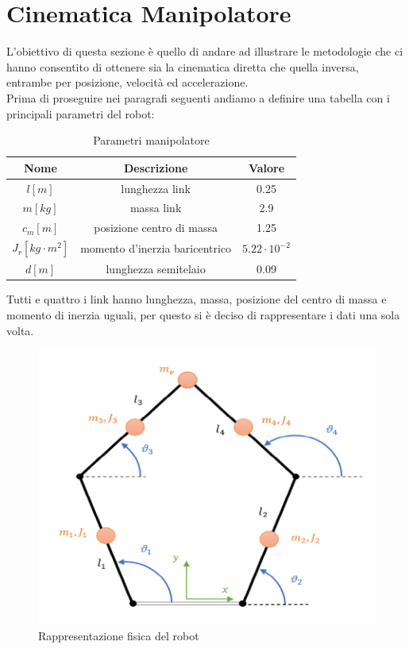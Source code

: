 \section{Cinematica Manipolatore}
L'obiettivo di questa sezione è quello di andare ad illustrare le metodologie che ci hanno consentito di ottenere sia la cinematica diretta che quella inversa, entrambe per posizione, velocità ed accelerazione.
\\Prima di proseguire nei paragrafi seguenti andiamo a definire una tabella con i principali parametri del robot:
\begin{table}[h!]
\centering
\begin{tabular}{|c |c |c|} 
 \hline
 Nome & Descrizione  & Valore \\ [0.5ex] 
 \hline\hline
 $l [m]$ & lunghezza link  & 0.25 \\ 
 $m [kg]$ & massa link & 2.9 \\
 $c_m [m]$ & posizione centro di massa & 1.25 \\
 $J_r [kg\cdot m^2]$ & momento d'inerzia baricentrico & $5.22\cdot 10^{-2}$ \\
 $d [m]$ & lunghezza semitelaio & 0.09 \\
 \hline
\end{tabular}
\caption{Parametri manipolatore}
\label{table:1}
\end{table}
Tutti e quattro i link hanno lunghezza, massa, posizione del centro di massa e momento di inerzia uguali, per questo si è deciso di rappresentare i dati una sola volta.
\begin{figure}[ht]
\begin{center}
    \includegraphics[scale=0.6]{Immagini/Robot2.png}
    \caption{Rappresentazione fisica del robot}
\end{center}
\end{figure}
